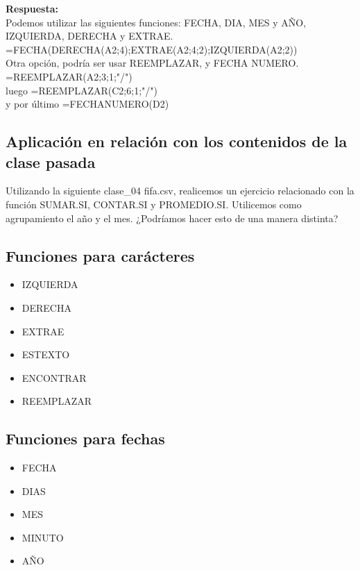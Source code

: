 \documentclass[12 pt,letterpaper]{article}
\newenvironment{solution}
{\begin{mdframed} \textbf{Respuesta:} \ \\}
	{\end{mdframed}}
\begin{document}
\begin{solution}
	Podemos utilizar las siguientes funciones: FECHA, DIA, MES y AÑO, IZQUIERDA, DERECHA y EXTRAE. \\
	
	=FECHA(DERECHA(A2;4);EXTRAE(A2;4;2);IZQUIERDA(A2;2)) \\
	
	Otra opción, podría ser usar REEMPLAZAR, y FECHA NUMERO. \\
	
	=REEMPLAZAR(A2;3;1;"/") \\
	
	luego =REEMPLAZAR(C2;6;1;"/") \\
	
	y por último =FECHANUMERO(D2)	
\end{solution}

\subsection{Aplicación en relación con los contenidos de la clase pasada}

Utilizando la siguiente clase\_04 fifa.csv, realicemos un ejercicio relacionado con la función SUMAR.SI, CONTAR.SI y PROMEDIO.SI. Utilicemos como agrupamiento el año y el mes. ¿Podríamos hacer esto de una manera distinta?

\subsection{Funciones para carácteres}

\begin{itemize}
	\item IZQUIERDA
	\item DERECHA
	\item EXTRAE
	\item ESTEXTO
	\item ENCONTRAR
	\item REEMPLAZAR
\end{itemize}

\subsection{Funciones para fechas}

\begin{itemize}
	\item FECHA
	\item DIAS
	\item MES
	\item MINUTO
	\item AÑO
\end{itemize}
\end{document}
